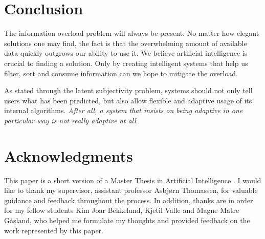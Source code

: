 \section{Conclusion}
\label{sec:conclusion}

The information overload problem will always be present.
No matter how elegant solutions one may find,
the fact is that the overwhelming amount of available data
quickly outgrows our ability to use it.
We believe artificial intelligence is crucial to finding a solution.
Only by creating intelligent systems that 
help us filter, sort and consume information can we hope 
to mitigate the overload.

As stated through the latent subjectivity problem,
systems should not only tell users what has been predicted,
but also allow flexible and adaptive usage of its internal algorithms.
\emph{After all, a system that insists on being adaptive
in one particular way is not really adaptive at all}.


\section*{Acknowledgments}
\label{sec:method}

This paper is a short version of a Master Thesis in Artificial Intelligence
\cite{Bjorkoy2011}.
I would like to thank my supervisor, assistant professor Asbjørn Thomassen, for valuable guidance and feedback throughout the process.
In addition, thanks are in order for my fellow students 
Kim Joar Bekkelund, Kjetil Valle and Magne Matre Gåsland,
who helped me formulate my thoughts and provided feedback on the work represented by this paper.


